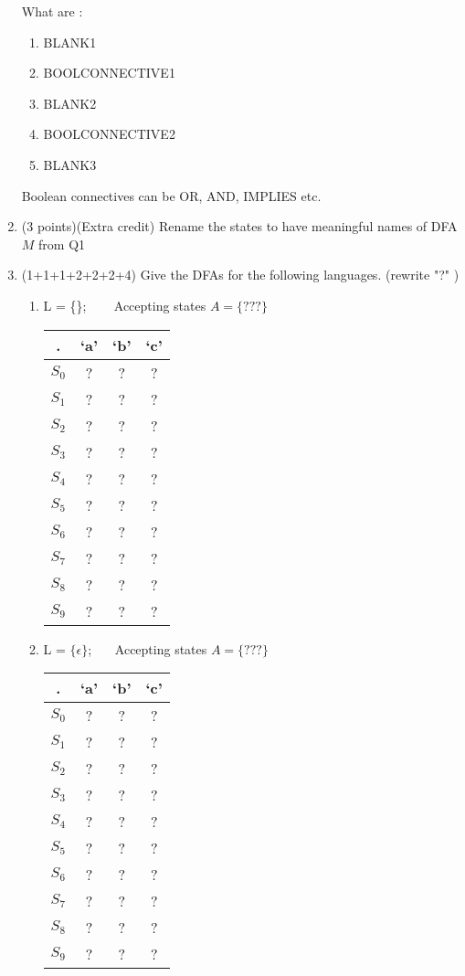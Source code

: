 \documentclass[10pt]{article}
\begin{document}
\begin{enumerate}
What are :
\begin{enumerate}
    \item BLANK1
    \item BOOLCONNECTIVE1
    \item BLANK2
    \item BOOLCONNECTIVE2
    \item BLANK3
\end{enumerate} 
Boolean connectives can be OR, AND, IMPLIES etc.


\item (3 points)(Extra credit) Rename the states to have meaningful names of DFA $M$ from Q1

 \newpage 
 
\item (1+1+1+2+2+2+4) Give the DFAs for the following languages. (rewrite "?" )
\begin{enumerate}
    \item L = \{\};  ~~~
Accepting states $A = \{???\}$

       \begin{center}
      \begin{tabular}{ |c|c|c|c| } 
        \hline
 .  & `a' & `b' & `c' \\\hline \hline
 $S_0$ & ? & ? & ?\\ \hline
 $S_1$ & ? & ? & ? \\ \hline
 $S_2$ & ? & ? & ? \\ \hline
 $S_3$ & ? & ? & ? \\ \hline
 $S_4$ & ? & ? & ? \\ \hline
 $S_5$ & ? & ? & ? \\ \hline
 $S_6$ & ? & ? & ? \\ \hline
 $S_7$ & ? & ? & ? \\ \hline
 $S_8$ & ? & ? & ? \\ \hline
 $S_9$ & ? & ? & ? \\ \hline
\end{tabular}
\end{center}
    
    
\item L = $\{\epsilon\}$; ~~~Accepting states $A =\{???\}$
     \begin{center}
      \begin{tabular}{ |c|c|c|c| } 
        \hline
 .  & `a' & `b' & `c' \\\hline \hline
 $S_0$ & ? & ? & ?\\ \hline
 $S_1$ & ? & ? & ? \\ \hline
 $S_2$ & ? & ? & ? \\ \hline
 $S_3$ & ? & ? & ? \\ \hline
 $S_4$ & ? & ? & ? \\ \hline
 $S_5$ & ? & ? & ? \\ \hline
 $S_6$ & ? & ? & ? \\ \hline
 $S_7$ & ? & ? & ? \\ \hline
 $S_8$ & ? & ? & ? \\ \hline
 $S_9$ & ? & ? & ? \\ \hline
\end{tabular}
\end{center}


\end{enumerate}
\end{enumerate}
\end{document}
